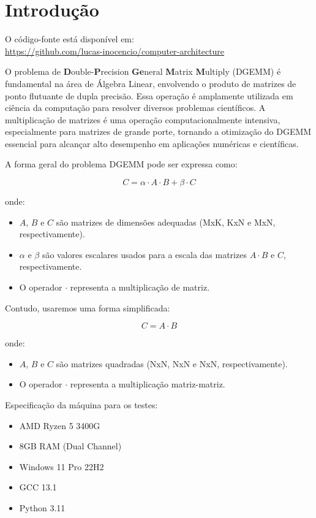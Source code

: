 \documentclass[12pt]{article}
\begin{document}
\newpage
\newpage

\section{Introdução}

O código-fonte está disponível em: \\
\url{https://github.com/lucas-inocencio/computer-architecture}

O problema de \textbf{D}ouble-\textbf{P}recision \textbf{Ge}neral \textbf{M}atrix \textbf{M}ultiply (DGEMM) é fundamental na área de Álgebra Linear, envolvendo o produto de matrizes de ponto flutuante de dupla precisão. Essa operação é amplamente utilizada em ciência da computação para resolver diversos problemas científicos. A multiplicação de matrizes é uma operação computacionalmente intensiva, especialmente para matrizes de grande porte, tornando a otimização do DGEMM essencial para alcançar alto desempenho em aplicações numéricas e científicas.

A forma geral do problema DGEMM pode ser expressa como:

\[ C = \alpha \cdot A \cdot B + \beta \cdot C \]

onde:

\begin{itemize}
    \item $A$, $B$ e $C$ são matrizes de dimensões adequadas (MxK, KxN e MxN, respectivamente).
    \item $\alpha$ e $\beta$ são valores escalares usados para a escala das matrizes $A \cdot B$ e $C$, respectivamente.
    \item O operador $\cdot$ representa a multiplicação de matriz.
\end{itemize}

Contudo, usaremos uma forma simplificada:

\[ C = A \cdot B \]

onde:

\begin{itemize}
    \item $A$, $B$ e $C$ são matrizes quadradas (NxN, NxN e NxN, respectivamente).
    \item O operador $\cdot$ representa a multiplicação matriz-matriz.
\end{itemize}


Especificação da máquina para os testes:

\begin{itemize}
    \item AMD Ryzen 5 3400G
    \item 8GB RAM (Dual Channel)
    \item Windows 11 Pro 22H2
    \item GCC 13.1
    \item Python 3.11
\end{itemize}
\end{document}
